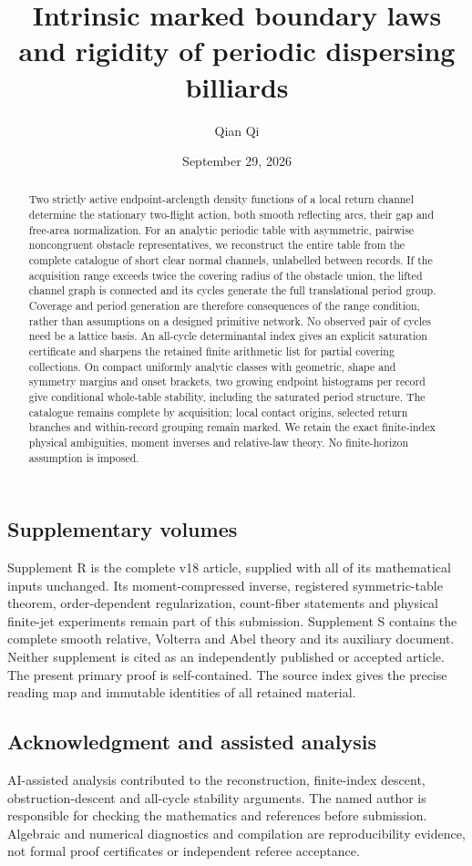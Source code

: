 \documentclass[11pt]{amsart}
\title[Intrinsic marked boundary laws]{Intrinsic marked boundary laws and rigidity of periodic dispersing billiards}
\author{Qian Qi}
\date{September 29, 2026}
\theoremstyle{definition}\newtheorem{definition}[theorem]{Definition}
\theoremstyle{remark}\newtheorem{remark}[theorem]{Remark}
\numberwithin{equation}{section}
\begin{document}
\begin{abstract}
Two strictly active endpoint-arclength density functions of a local
return channel determine the stationary two-flight action, both smooth
reflecting arcs, their gap and free-area normalization. For an analytic
periodic table with asymmetric, pairwise noncongruent obstacle
representatives, we reconstruct the entire table from the complete
catalogue of short clear normal channels, unlabelled between records.
If the acquisition range exceeds twice the covering radius of the
obstacle union, the lifted channel graph is connected and its cycles
generate the full translational period group. Coverage and period
generation are therefore consequences of the range condition, rather
than assumptions on a designed primitive network. No observed pair of
cycles need be a lattice basis. An all-cycle determinantal index gives
an explicit saturation certificate and sharpens the retained finite
arithmetic list for partial covering collections. On compact uniformly
analytic classes with geometric, shape and symmetry margins and onset
brackets, two growing endpoint histograms per record give conditional
whole-table stability, including the saturated period structure.
The catalogue remains complete by acquisition; local contact origins,
selected return branches and within-record grouping remain marked.
We retain the exact finite-index physical ambiguities, moment inverses
and relative-law theory. No finite-horizon assumption is imposed.
\end{abstract}
\maketitle






\subsection*{Supplementary volumes}
Supplement R is the complete v18 article, supplied with
all of its mathematical inputs unchanged. Its moment-compressed inverse,
registered symmetric-table theorem, order-dependent regularization,
count-fiber statements and physical finite-jet experiments remain part
of this submission. Supplement S contains the complete smooth relative,
Volterra and Abel theory and its auxiliary document. Neither supplement
is cited as an independently published or accepted article. The present
primary proof is self-contained. The source index gives the precise
reading map and immutable identities of all retained material.
\subsection*{Acknowledgment and assisted analysis}
AI-assisted analysis contributed to the reconstruction, finite-index
descent, obstruction-descent and all-cycle stability arguments. The named author is responsible for
checking the mathematics and references before submission. Algebraic
and numerical diagnostics and compilation are reproducibility evidence,
not formal proof certificates or independent referee acceptance.

\end{document}
